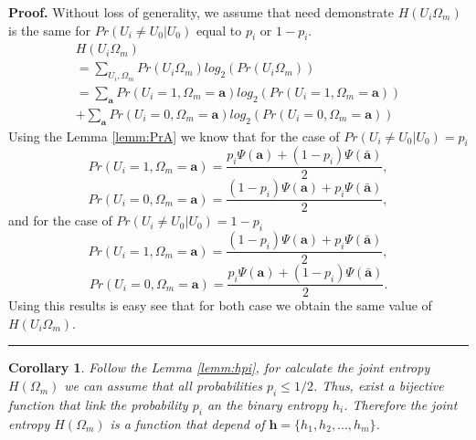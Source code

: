 \documentclass[journal]{IEEEtran}
\newenvironment{proof}[1][Proof]{\textbf{#1.} }{\ \rule{0.5em}{0.5em}}
\newtheorem{corollary}[theorem]{Corollary}
\begin{document}
\begin{proof}
 \label{proof:hpi} 
Without loss of generality, we assume that need demonstrate $H(U_i\Omega_{m})$
is the same for $Pr(U_i\neq U_0|U_0)$ equal to $p_i$ or $1-p_i$.
\begin{equation}\label{eq:hpi1}
\begin{matrix}
H(U_i\Omega_{m})\\
=\sum \limits_{U_i,\Omega_{m}} Pr(U_i\Omega_{m}) log_2(Pr(U_i\Omega_{m})) ~~~~~~~~~~~~~~~~~~~~\\
=\sum \limits_{\mathbf{a}} Pr(U_i=1,\Omega_{m}=\mathbf{a}) log_2(Pr(U_i=1,\Omega_{m}=\mathbf{a}))\\
+\sum \limits_{\mathbf{a}} Pr(U_i=0,\Omega_{m}=\mathbf{a}) log_2(Pr(U_i=0,\Omega_{m}=\mathbf{a}))
\end{matrix}
\end{equation}
Using the Lemma \ref{lemm:PrA} we know that for the case of $Pr(U_i\neq U_0|U_0)=p_i$ 
\begin{equation}\label{eq:hpi2}
Pr(U_i=1,\Omega_m=\mathbf{a})=\frac{ p_i\Psi(\mathbf{a}) + (1-p_i)\Psi(\mathbf{\bar{a}}) }{2},
\end{equation}
\begin{equation}\label{eq:hpi3}
Pr(U_i=0,\Omega_m=\mathbf{a})=\frac{ (1-p_i)\Psi(\mathbf{a}) + p_i\Psi(\mathbf{\bar{a}}) }{2},
\end{equation}
and for the case of $Pr(U_i\neq U_0|U_0)=1-p_i$
\begin{equation}\label{eq:hpi4}
Pr(U_i=1,\Omega_m=\mathbf{a})=\frac{ (1-p_i)\Psi(\mathbf{a}) + p_i\Psi(\mathbf{\bar{a}}) }{2},
\end{equation}
\begin{equation}\label{eq:hpi5}
Pr(U_i=0,\Omega_m=\mathbf{a})=\frac{ p_i\Psi(\mathbf{a}) + (1-p_i)\Psi(\mathbf{\bar{a}}) }{2}.
\end{equation}
Using this results is easy see that for both case  we obtain the same value of 
$H(U_i\Omega_{m})$.
\end{proof}
\begin{corollary}
 \label{coro:hpi} 
Follow the Lemma \ref{lemm:hpi}, for calculate the joint entropy $H(\Omega_m)$ 
we can assume that all probabilities $p_i \leq 1/2$. Thus, exist a bijective 
function that link the probability $p_i$ an the binary entropy $h_i$. Therefore
the joint entropy $H(\Omega_m)$ is a function that depend of $\mathbf{h}=\{h_1, h_2, ..., h_m\}$.
\end{corollary}
\end{document}
